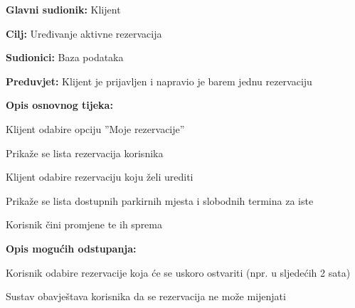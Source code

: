 \noindent {}
\begin{packed_item}
	
	\item \textbf{Glavni sudionik: }Klijent
	\item  \textbf{Cilj:} Uređivanje aktivne rezervacija
	\item  \textbf{Sudionici:} Baza podataka
	\item  \textbf{Preduvjet:} Klijent je prijavljen i napravio je barem jednu rezervaciju
	\item  \textbf{Opis osnovnog tijeka:}
	
	\item[] \begin{packed_enum}
		
		\item Klijent odabire opciju ”Moje rezervacije”
		\item Prikaže se lista rezervacija korisnika
		\item Klijent odabire rezervaciju koju želi urediti
		\item Prikaže se lista dostupnih parkirnih mjesta i slobodnih termina za iste
		\item Korisnik čini promjene te ih sprema
		
		
	\end{packed_enum}
	
	\item  \textbf{Opis mogućih odstupanja:}
	
	\item[] \begin{packed_item}
		
		\item[3.a] Korisnik odabire rezervacije koja će se uskoro ostvariti (npr. u sljedećih 2 sata)
		\item[] \begin{packed_enum}
			
			\item Sustav obavještava korisnika da se rezervacija ne može mijenjati
			
			
		\end{packed_enum}
		
		
	\end{packed_item}
\end{packed_item}

